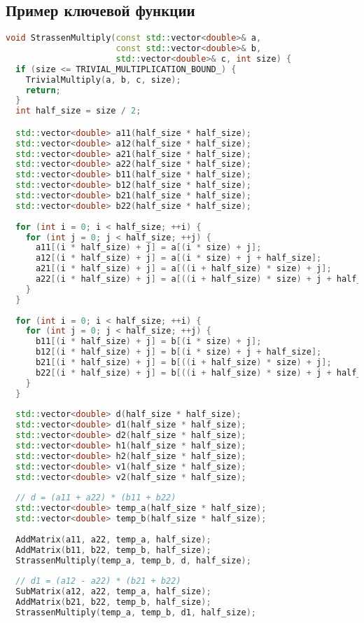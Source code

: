 \documentclass[14pt,a4paper]{extarticle}
\begin{document}
\subsection*{Пример ключевой функции}
\begin{lstlisting}[language=C++]
void StrassenMultiply(const std::vector<double>& a,
                      const std::vector<double>& b,
                      std::vector<double>& c, int size) {
  if (size <= TRIVIAL_MULTIPLICATION_BOUND_) {
    TrivialMultiply(a, b, c, size);
    return;
  }
  int half_size = size / 2;

  std::vector<double> a11(half_size * half_size);
  std::vector<double> a12(half_size * half_size);
  std::vector<double> a21(half_size * half_size);
  std::vector<double> a22(half_size * half_size);
  std::vector<double> b11(half_size * half_size);
  std::vector<double> b12(half_size * half_size);
  std::vector<double> b21(half_size * half_size);
  std::vector<double> b22(half_size * half_size);
    
  for (int i = 0; i < half_size; ++i) {
    for (int j = 0; j < half_size; ++j) {
      a11[(i * half_size) + j] = a[(i * size) + j];
      a12[(i * half_size) + j] = a[(i * size) + j + half_size];
      a21[(i * half_size) + j] = a[((i + half_size) * size) + j];
      a22[(i * half_size) + j] = a[((i + half_size) * size) + j + half_size];
    }
  }
    
  for (int i = 0; i < half_size; ++i) {
    for (int j = 0; j < half_size; ++j) {
      b11[(i * half_size) + j] = b[(i * size) + j];
      b12[(i * half_size) + j] = b[(i * size) + j + half_size];
      b21[(i * half_size) + j] = b[((i + half_size) * size) + j];
      b22[(i * half_size) + j] = b[((i + half_size) * size) + j + half_size];
    }
  }
  
  std::vector<double> d(half_size * half_size);
  std::vector<double> d1(half_size * half_size);
  std::vector<double> d2(half_size * half_size);
  std::vector<double> h1(half_size * half_size);
  std::vector<double> h2(half_size * half_size);
  std::vector<double> v1(half_size * half_size);
  std::vector<double> v2(half_size * half_size);
  
  // d = (a11 + a22) * (b11 + b22)
  std::vector<double> temp_a(half_size * half_size);
  std::vector<double> temp_b(half_size * half_size);
  
  AddMatrix(a11, a22, temp_a, half_size);
  AddMatrix(b11, b22, temp_b, half_size);
  StrassenMultiply(temp_a, temp_b, d, half_size);
  
  // d1 = (a12 - a22) * (b21 + b22)
  SubMatrix(a12, a22, temp_a, half_size);
  AddMatrix(b21, b22, temp_b, half_size);
  StrassenMultiply(temp_a, temp_b, d1, half_size);
    

\end{lstlisting}
\end{document}
